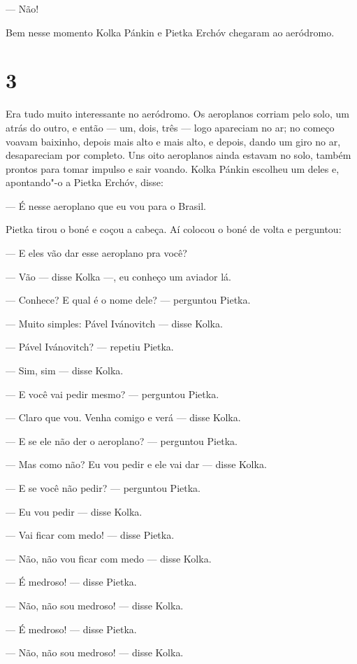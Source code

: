 --- Não!

Bem nesse momento Kolka Pánkin e Pietka Erchóv chegaram ao aeródromo.

\section{3}

Era tudo muito interessante no aeródromo. Os aeroplanos corriam pelo
solo, um atrás do outro, e então --- um, dois, três --- logo apareciam
no ar; no começo voavam baixinho, depois mais alto e mais alto, e
depois, dando um giro no ar, desapareciam por completo. Uns oito
aeroplanos ainda estavam no solo, também prontos para tomar impulso e
sair voando. Kolka Pánkin escolheu um deles e, apontando"-o a Pietka
Erchóv, disse:

--- É nesse aeroplano que eu vou para o Brasil.

Pietka tirou o boné e coçou a cabeça. Aí colocou o boné de volta e
perguntou:

--- E eles vão dar esse aeroplano pra você?

--- Vão --- disse Kolka ---, eu conheço um aviador lá.

--- Conhece? E qual é o nome dele? --- perguntou Pietka.

--- Muito simples: Pável Ivánovitch --- disse Kolka.

--- Pável Ivánovitch? --- repetiu Pietka.

--- Sim, sim --- disse Kolka.

--- E você vai pedir mesmo? --- perguntou Pietka.

--- Claro que vou. Venha comigo e verá --- disse Kolka.

--- E se ele não der o aeroplano? --- perguntou Pietka.

--- Mas como não? Eu vou pedir e ele vai dar --- disse Kolka.

--- E se você não pedir? --- perguntou Pietka.

--- Eu vou pedir --- disse Kolka.

--- Vai ficar com medo! --- disse Pietka.

--- Não, não vou ficar com medo --- disse Kolka.

--- É medroso! --- disse Pietka.

--- Não, não sou medroso! --- disse Kolka.

--- É medroso! --- disse Pietka.

--- Não, não sou medroso! --- disse Kolka.

